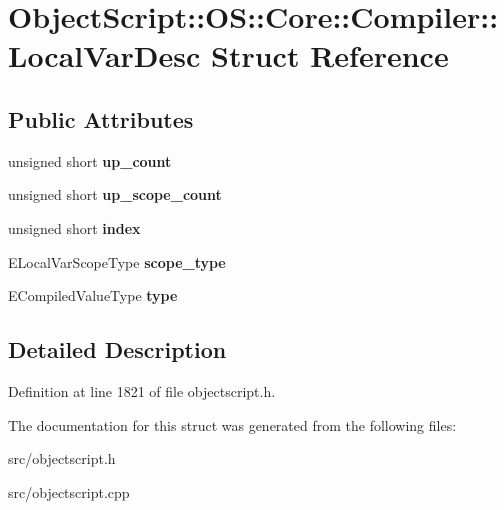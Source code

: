 \hypertarget{struct_object_script_1_1_o_s_1_1_core_1_1_compiler_1_1_local_var_desc}{}\section{Object\+Script\+:\+:OS\+:\+:Core\+:\+:Compiler\+:\+:Local\+Var\+Desc Struct Reference}
\label{struct_object_script_1_1_o_s_1_1_core_1_1_compiler_1_1_local_var_desc}
\subsection*{Public Attributes}
\begin{DoxyCompactItemize}
\item 
unsigned short {\bfseries up\+\_\+count}\hypertarget{struct_object_script_1_1_o_s_1_1_core_1_1_compiler_1_1_local_var_desc_aea303af781e2468cce13ed66ea669024}{}\label{struct_object_script_1_1_o_s_1_1_core_1_1_compiler_1_1_local_var_desc_aea303af781e2468cce13ed66ea669024}

\item 
unsigned short {\bfseries up\+\_\+scope\+\_\+count}\hypertarget{struct_object_script_1_1_o_s_1_1_core_1_1_compiler_1_1_local_var_desc_af6b573b2f950a422f1ea74590aeae482}{}\label{struct_object_script_1_1_o_s_1_1_core_1_1_compiler_1_1_local_var_desc_af6b573b2f950a422f1ea74590aeae482}

\item 
unsigned short {\bfseries index}\hypertarget{struct_object_script_1_1_o_s_1_1_core_1_1_compiler_1_1_local_var_desc_a5b67d25ecc66cbc02d0dfb31a8fa3be7}{}\label{struct_object_script_1_1_o_s_1_1_core_1_1_compiler_1_1_local_var_desc_a5b67d25ecc66cbc02d0dfb31a8fa3be7}

\item 
E\+Local\+Var\+Scope\+Type {\bfseries scope\+\_\+type}\hypertarget{struct_object_script_1_1_o_s_1_1_core_1_1_compiler_1_1_local_var_desc_ac01d3f7ac47c3ca8f9aa6157ef706cf7}{}\label{struct_object_script_1_1_o_s_1_1_core_1_1_compiler_1_1_local_var_desc_ac01d3f7ac47c3ca8f9aa6157ef706cf7}

\item 
E\+Compiled\+Value\+Type {\bfseries type}\hypertarget{struct_object_script_1_1_o_s_1_1_core_1_1_compiler_1_1_local_var_desc_a3eb36e3d17a5a03b6be7bd2462eb8663}{}\label{struct_object_script_1_1_o_s_1_1_core_1_1_compiler_1_1_local_var_desc_a3eb36e3d17a5a03b6be7bd2462eb8663}

\end{DoxyCompactItemize}


\subsection{Detailed Description}


Definition at line 1821 of file objectscript.\+h.



The documentation for this struct was generated from the following files\+:\begin{DoxyCompactItemize}
\item 
src/objectscript.\+h\item 
src/objectscript.\+cpp\end{DoxyCompactItemize}
